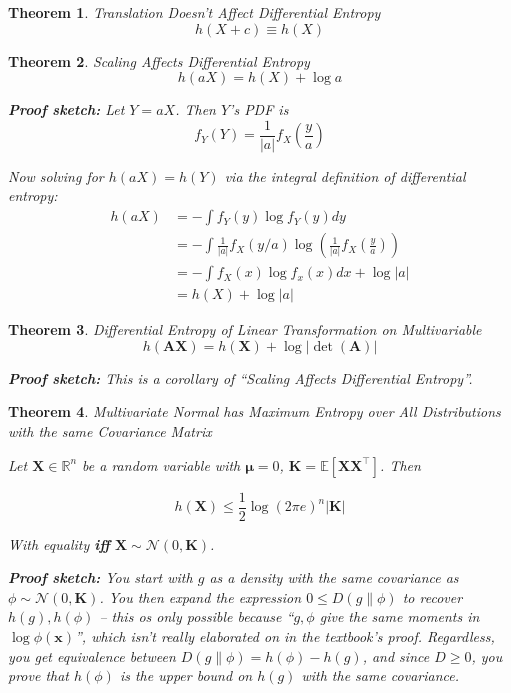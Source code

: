 \documentclass[a4paper,12pt]{report}
\newtheorem{theorem}{Theorem}
\begin{document}
\begin{theorem}{Translation Doesn't Affect Differential Entropy}
\begin{equation}
	h(X + c) \equiv h(X)
\end{equation}
\end{theorem}

\begin{theorem}{Scaling Affects Differential Entropy}
\begin{equation}
	h(aX) = h(X) +\log a
\end{equation}

\textbf{Proof sketch:} Let $Y = aX$. Then $Y$'s PDF is
\begin{equation}
	f_Y(Y) = \frac{1}{|a|} f_X(\frac y a)
\end{equation}

Now solving for $h(aX) = h(Y)$ via the integral definition of differential entropy:
\begin{align}
h(aX) 	&= -\int f_Y(y) \log f_Y(y) dy \\
		&= -\int \frac{1}{|a|} f_X(y/a)	\log \left(  \frac{1}{|a|}
		f_X(\frac{y}{a}) \right) \\
		&= -\int f_X(x) \log f_x(x) dx + \log |a| \\
		&= h(X) + \log |a|
\end{align}
\end{theorem}


\begin{theorem}{Differential Entropy of Linear Transformation on Multivariable}
\begin{equation}
	h(\mathbf A \mathbf X) = h(\mathbf X) + \log |\det(\mathbf A)|
\end{equation}

\textbf{Proof sketch:} This is a corollary of ``Scaling Affects Differential
Entropy''.
\end{theorem}



\begin{theorem}{Multivariate Normal has Maximum Entropy over All Distributions
with the same Covariance Matrix}

Let $\mathbf X \in \mathbb R^n$ be a random variable with $\mathbf \mu = 0$,
$\mathbf K = \mathbb E \left[ \mathbf X \mathbf X^\top \right]$. Then 

\begin{equation}
	h(\mathbf X) \leq \frac{1}{2} \log (2\pi e)^n \left| \mathbf K \right|
\end{equation}

With equality \textbf{iff} $\mathbf X \sim \mathcal N(0, \mathbf K)$.

\textbf{Proof sketch:} You start with $g$ as a density with the same covariance
as $\phi \sim \mathcal N(0, \mathbf K)$. You then expand the expression $0 \leq
D(g \| \phi)$ to recover $h(g), h(\phi)$ -- this os only possible because ``$g,
\phi$ give the same moments in $\log \phi(\mathbf x)$'', which isn't
really elaborated on in the textbook's proof. Regardless, you get equivalence
between $D(g \| \phi) = h(\phi) - h(g)$, and since $D \geq 0$, you prove that
$h(\phi)$ is the upper bound on $h(g)$ with the same covariance.
\end{theorem}
\end{document}
